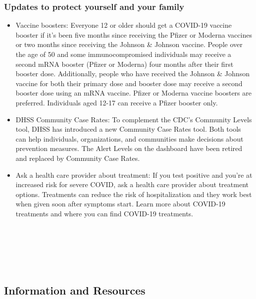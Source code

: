\documentclass[
]{article}
\begin{document}
\hypertarget{updates-to-protect-yourself-and-your-family}{%
\subsubsection*{Updates to protect yourself and your
family}\label{updates-to-protect-yourself-and-your-family}}

\begin{itemize}
\item
  Vaccine boosters: Everyone 12 or older should get a COVID-19 vaccine
  booster if it's been five months since receiving the Pfizer or Moderna
  vaccines or two months since receiving the Johnson \& Johnson vaccine.
  People over the age of 50 and some immunocompromised individuals may
  receive a second mRNA booster (Pfizer or Moderna) four months after
  their first booster dose. Additionally, people who have received the
  Johnson \& Johnson vaccine for both their primary dose and booster
  dose may receive a second booster dose using an mRNA vaccine. Pfizer
  or Moderna vaccine boosters are preferred. Individuals aged 12-17 can
  receive a Pfizer booster only.
\item
  DHSS Community Case Rates: To complement the CDC's Community Levels
  tool, DHSS has introduced a new Community Case Rates tool. Both tools
  can help individuals, organizations, and communities make decisions
  about prevention measures. The Alert Levels on the dashboard have been
  retired and replaced by Community Case Rates.
\item
  Ask a health care provider about treatment: If you test positive and
  you're at increased risk for severe COVID, ask a health care provider
  about treatment options. Treatments can reduce the risk of
  hospitalization and they work best when given soon after symptoms
  start. Learn more about COVID-19 treatments and where you can find
  COVID-19 treatments.
\end{itemize}

~

~

~

\hypertarget{information-and-resources}{%
\subsection{Information and Resources}\label{information-and-resources}}
\end{document}
